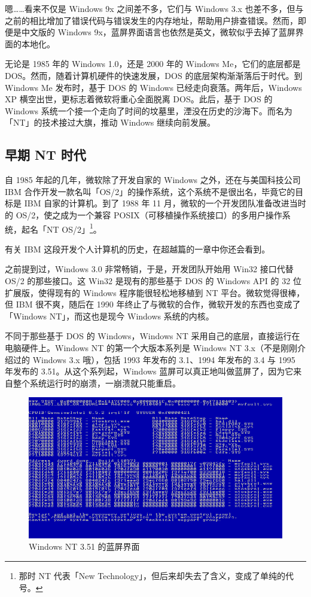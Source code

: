 嗯……看来不仅是 Windows 9x 之间差不多，它们与 Windows 3.x 也差不多，但与之前的相比增加了错误代码与错误发生的内存地址，帮助用户排查错误。然而，即便是中文版的 Windows 9x，蓝屏界面语言也依然是英文，微软似乎去掉了蓝屏界面的本地化。

无论是 1985 年的 Windows 1.0，还是 2000 年的 Windows Me，它们的底层都是 DOS。然而，随着计算机硬件的快速发展，DOS 的底层架构渐渐落后于时代。到 Windows Me 发布时，基于 DOS 的 Windows 已经走向衰落。两年后，Windows XP 横空出世，更标志着微软将重心全面脱离 DOS。此后，基于 DOS 的 Windows 系统一个接一个走向了时间的坟墓里，湮没在历史的沙海下。而名为「NT」的技术接过大旗，推动 Windows 继续向前发展。

\subsection{早期 NT 时代}

自 1985 年起的几年，微软除了开发自家的 Windows 之外，还在与美国科技公司 IBM 合作开发一款名叫「OS/2」的操作系统，这个系统不是很出名，毕竟它的目标是 IBM 自家的计算机。到了 1988 年 11 月，微软的一个开发团队准备改进当时的 OS/2，使之成为一个兼容 POSIX（可移植操作系统接口）的多用户操作系统，起名「NT OS/2」\footnote{那时 NT 代表「New Technology」，但后来却失去了含义，变成了单纯的代号。}。

\begin{note}
  有关 IBM 这段开发个人计算机的历史，在超越篇的一章中你还会看到。
\end{note}

之前提到过，Windows 3.0 非常畅销，于是，开发团队开始用 Win32 接口代替 OS/2 的那些接口。这 Win32 是现有的那些基于 DOS 的 Windows API 的 32 位扩展版，使得现有的 Windows 程序能很轻松地移植到 NT 平台。微软觉得很棒，但 IBM 很不爽，随后在 1990 年终止了与微软的合作，微软开发的东西也变成了「Windows NT」，而这也是现今 Windows 系统的内核。

不同于那些基于 DOS 的 Windows，Windows NT 采用自己的底层，直接运行在电脑硬件上。Windows NT 的第一个大版本系列是 Windows NT 3.x（不是刚刚介绍过的 Windows 3.x 哦），包括 1993 年发布的 3.1、1994 年发布的 3.4 与 1995 年发布的 3.51。从这个系列起，Windows 蓝屏可以真正地叫做蓝屏了，因为它来自整个系统运行时的崩溃，一崩溃就只能重启。

\begin{figure}[htb!]
  \centering
  \includegraphics[width=.62\textwidth]{assets/advanced/Win-NT-3.51-BSoD.png}
  \caption{Windows NT 3.51 的蓝屏界面}
  \label{fig:Win-NT-3.51-BSoD}
\end{figure}

